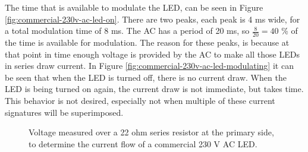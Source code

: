 The time that is available to modulate the LED, can be seen in Figure \ref{fig:commercial-230v-ac-led-on}.
There are two peaks, each peak is 4 ms wide, for a total modulation time of 8 ms.
The AC has a period of 20 ms, so $\frac{8}{20} = 40$ \% of the time is available for modulation.
The reason for these peaks, is because at that point in time enough voltage is provided by the AC to make all those LEDs in series draw current.
In Figure \ref{fig:commercial-230v-ac-led-modulating} it can be seen that when the LED is turned off, there is no current draw.
When the LED is being turned on again, the current draw is not immediate, but takes time.
This behavior is not desired, especially not when multiple of these current signatures will be superimposed.

\begin{figure}
	\centering     %

	\caption{Voltage measured over a 22 ohm series resistor at the primary side, to determine the current flow of a commercial 230 V AC LED.}
\end{figure}





